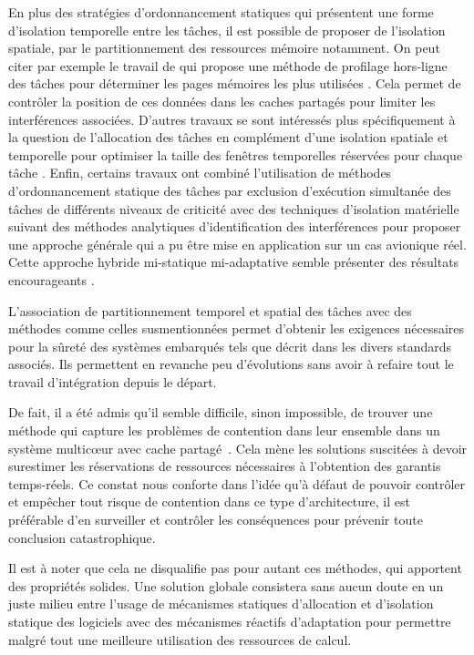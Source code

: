 \documentclass[french, a4paper, 11pt, twoside, pdftex]{StyleThese}
\begin{document}
	En plus des stratégies d'ordonnancement statiques qui présentent une forme d'isolation temporelle entre les tâches, il est possible de proposer de l'isolation spatiale, par le partitionnement des ressources mémoire notamment. On peut citer par exemple le travail de \cite{mancuso_real-time_2013} qui propose une méthode de profilage hors-ligne des tâches pour déterminer les pages mémoires les plus utilisées . Cela permet de contrôler la position de ces données dans les caches partagés pour limiter les interférences associées. D'autres travaux se sont intéressés plus spécifiquement à la question de l'allocation des tâches en complément d'une isolation spatiale et temporelle pour optimiser la taille des fenêtres temporelles réservées pour chaque tâche \cite{tamas-selicean_task_2011}. Enfin, certains travaux ont combiné l'utilisation de méthodes d'ordonnancement statique des tâches par exclusion d'exécution simultanée des tâches de différents niveaux de criticité avec des techniques d'isolation matérielle suivant des méthodes analytiques d'identification des interférences pour proposer une approche générale qui a pu être mise en application sur un cas avionique réel. Cette approche hybride mi-statique mi-adaptative semble présenter des résultats encourageants \cite{giannopoulou_scheduling_2013}.
	
	L'association de partitionnement temporel et spatial des tâches avec des méthodes comme celles susmentionnées permet d'obtenir les exigences nécessaires pour la sûreté des systèmes embarqués tels que décrit dans les divers standards associés. Ils permettent en revanche peu d'évolutions sans avoir à refaire tout le travail d'intégration depuis le départ. 
	
	De fait, il a été admis qu'il semble difficile, sinon impossible, de trouver une méthode qui capture les problèmes de contention dans leur ensemble dans un système multicœur avec cache partagé~\cite{suhendra_exploring_2008}. Cela mène les solutions suscitées à devoir surestimer les réservations de ressources nécessaires à l'obtention des garantis temps-réels. Ce constat nous conforte dans l'idée qu'à défaut de pouvoir contrôler et empêcher tout risque de contention dans ce type d'architecture, il est préférable d'en surveiller et contrôler les conséquences pour prévenir toute conclusion catastrophique.
	
	Il est à noter que cela ne disqualifie pas pour autant ces méthodes, qui apportent des propriétés solides. Une solution globale consistera sans aucun doute en un juste milieu entre l'usage de mécanismes statiques d'allocation et d'isolation statique des logiciels avec des mécanismes réactifs d'adaptation pour permettre malgré tout une meilleure utilisation des ressources de calcul.
	
\end{document}
